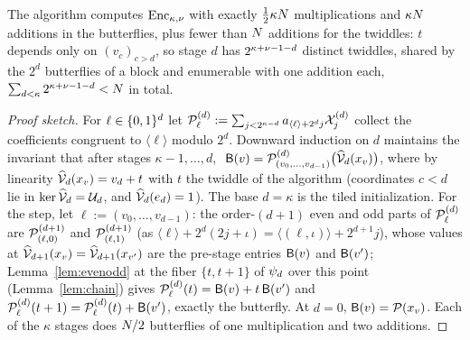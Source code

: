 \begin{center}
\end{center}

\begin{proposition}\label{prop:ntt}
The algorithm computes $\mathrm{Enc}_{\kappa,\nu}$ with exactly $\tfrac12 \kappa N$ multiplications and $\kappa N$ additions in the butterflies, plus fewer than $N$ additions for the twiddles: $t$ depends only on $(v_c)_{c > d}$, so stage $d$ has $2^{\kappa + \nu - 1 - d}$ distinct twiddles, shared by the $2^{d}$ butterflies of a block and enumerable with one addition each, $\sum_{d < \kappa} 2^{\kappa + \nu - 1 - d} < N$ in total.
\end{proposition}

\begin{proof}[Proof sketch]
For $\ell \in \{0,1\}^{d}$ let $\mathcal{P}^{(d)}_{\ell} := \sum_{j < 2^{\kappa-d}} a_{\langle \ell \rangle + 2^d j} \mathcal{X}^{(d)}_j$ collect the coefficients congruent to $\langle \ell \rangle$ modulo $2^d$. Downward induction on $d$ maintains the invariant that after stages $\kappa-1, \dots, d$, $\ \mathsf{B}(v) = \mathcal{P}^{(d)}_{(v_0,\dots,v_{d-1})}\bigl(\widehat{\mathcal{V}}_{d}(x_v)\bigr)$, where by linearity $\widehat{\mathcal{V}}_{d}(x_v) = v_d + t$ with $t$ the twiddle of the algorithm (coordinates $c < d$ lie in $\ker \widehat{\mathcal{V}}_{d} = \mathcal{U}_d$, and $\widehat{\mathcal{V}}_{d}(e_d) = 1$). The base $d = \kappa$ is the tiled initialization. For the step, let $\ell := (v_0, \dots, v_{d-1})$: the order-$(d{+}1)$ even and odd parts of $\mathcal{P}^{(d)}_{\ell}$ are $\mathcal{P}^{(d+1)}_{(\ell,0)}$ and $\mathcal{P}^{(d+1)}_{(\ell,1)}$ (as $\langle \ell \rangle + 2^d(2j+\iota) = \langle (\ell,\iota) \rangle + 2^{d+1} j$), whose values at $\widehat{\mathcal{V}}_{d+1}(x_v) = \widehat{\mathcal{V}}_{d+1}(x_{v'})$ are the pre-stage entries $\mathsf{B}(v)$ and $\mathsf{B}(v')$; Lemma~\ref{lem:evenodd} at the fiber $\{t, t+1\}$ of $\psi_d$ over this point (Lemma~\ref{lem:chain}) gives $\mathcal{P}^{(d)}_{\ell}(t) = \mathsf{B}(v) + t\,\mathsf{B}(v')$ and $\mathcal{P}^{(d)}_{\ell}(t+1) = \mathcal{P}^{(d)}_{\ell}(t) + \mathsf{B}(v')$, exactly the butterfly. At $d = 0$, $\mathsf{B}(v) = \mathcal{P}(x_v)$. Each of the $\kappa$ stages does $N/2$ butterflies of one multiplication and two additions.
\end{proof}

